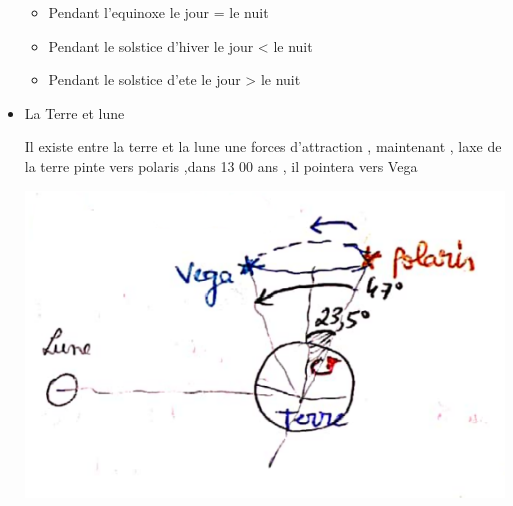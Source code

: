 \documentclass[12pt]{book}
\begin{document}
\begin{itemize}
                    \begin{itemize}
                        \item Pendant l'equinoxe le jour = le nuit 
                        \item Pendant le solstice d'hiver le jour < le nuit 
                        \item Pendant le solstice d'ete le jour > le nuit 
                    \end{itemize}
            \item La Terre et lune \\
                \begin{minipage}{0.65\linewidth}
                    Il existe entre la terre et la lune une forces d'attraction , maintenant , laxe de la terre pinte vers polaris ,dans 13 00 ans , il pointera vers Vega
                \end{minipage}
                \begin{minipage}{0.34\linewidth}
                    \includegraphics[width=\linewidth]{pic/vega.png}
                \end{minipage}
        \end{itemize}
\end{document}
